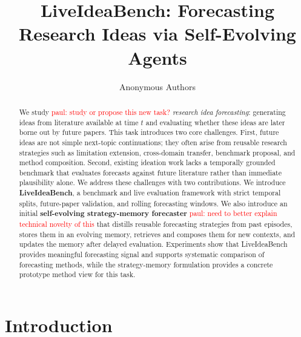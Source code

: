 \documentclass{article} %
\title{LiveIdeaBench: Forecasting Research Ideas via Self-Evolving Agents}
\author{Anonymous Authors}
\newcommand{\paul}[1]{\textcolor{red}{paul: #1}}
\begin{document}
\ifcolmsubmission
\linenumbers
\fi

\maketitle

\begin{abstract}
We study \paul{study or propose this new task?} \emph{research idea forecasting}: generating ideas from literature available at time $t$ and evaluating whether these ideas are later borne out by future papers. This task introduces two core challenges. First, future ideas are not simple next-topic continuations; they often arise from reusable research strategies such as limitation extension, cross-domain transfer, benchmark proposal, and method composition. Second, existing ideation work lacks a temporally grounded benchmark that evaluates forecasts against future literature rather than immediate plausibility alone. We address these challenges with two contributions. We introduce \textbf{LiveIdeaBench}, a benchmark and live evaluation framework with strict temporal splits, future-paper validation, and rolling forecasting windows. We also introduce an initial \textbf{self-evolving strategy-memory forecaster} \paul{need to better explain technical novelty of this} that distills reusable forecasting strategies from past episodes, stores them in an evolving memory, retrieves and composes them for new contexts, and updates the memory after delayed evaluation. Experiments show that LiveIdeaBench provides meaningful forecasting signal and supports systematic comparison of forecasting methods, while the strategy-memory formulation provides a concrete prototype method view for this task.
\end{abstract}

\section{Introduction}
\end{document}
